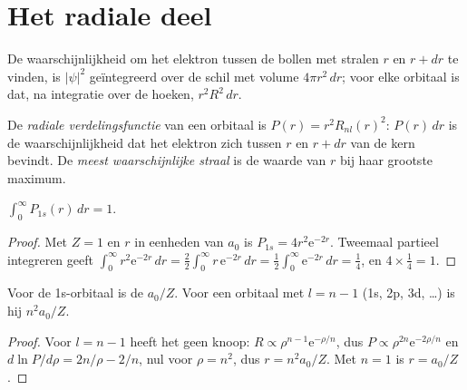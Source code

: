 \section{Het radiale deel}

De waarschijnlijkheid om het elektron tussen de bollen met stralen $r$ en $r +
dr$ te vinden, is $|\psi|^2$ geïntegreerd over de schil met volume $4\pi r^2\,dr$; voor elke
orbitaal is dat, na integratie over de hoeken, $r^2R^2\,dr$.

\begin{definition}\label{def:b2:atomic-orbitals:radial-distribution}
De \emph{radiale verdelingsfunctie} van
een orbitaal is $P(r) = r^2R_{nl}(r)^2$: $P(r)\,dr$ is de waarschijnlijkheid dat het
elektron zich tussen $r$ en $r + dr$ van de kern bevindt. De \emph{meest waarschijnlijke
straal} is de waarde van $r$ bij haar grootste maximum.
\end{definition}

\begin{proposition}\label{prop:b2:atomic-orbitals:normalised}
$\int_0^\infty P_{1s}(r)\,dr = 1$.
\end{proposition}

\begin{proof}
Met $Z = 1$ en $r$ in eenheden van $a_0$ is $P_{1s} = 4r^2\mathrm e^{-2r}$. Tweemaal partieel integreren geeft
$\int_0^\infty r^2\mathrm e^{-2r}\,dr = \frac22\int_0^\infty r\,\mathrm e^{-2r}\,dr =
\frac12\int_0^\infty\mathrm e^{-2r}\,dr = \frac14$, en $4 \times \frac14 = 1$.
\end{proof}

\begin{proposition}\label{prop:b2:atomic-orbitals:most-probable}
Voor de 1s-orbitaal is de  $a_0/Z$. Voor een orbitaal met $l =
n - 1$ (1s, 2p, 3d, \dots) is hij $n^2a_0/Z$.
\end{proposition}

\begin{proof}
Voor $l = n - 1$ heeft het  geen knoop: $R \propto \rho^{n-1}\mathrm e^{-\rho/n}$,
dus $P \propto \rho^{2n}\mathrm e^{-2\rho/n}$ en $d\ln P/d\rho = 2n/\rho - 2/n$, nul
voor $\rho = n^2$, dus $r = n^2a_0/Z$. Met $n = 1$ is $r = a_0/Z$.
\end{proof}

